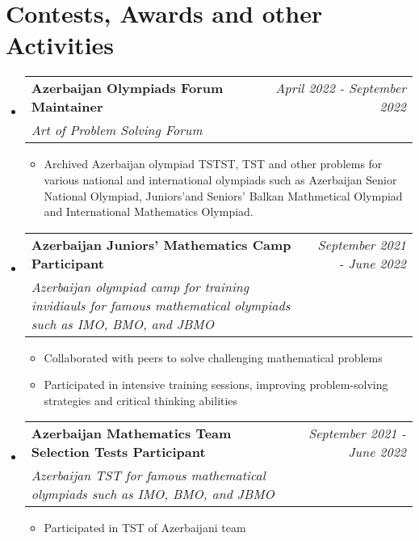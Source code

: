 \documentclass[a4paper,11pt]{article}
\makeatletter
\newcommand{\resumeProject}[4]{
    \vspace{0.5mm}
\item
    \begin{tabular*}{0.98\textwidth}[t]{l@{\extracolsep{\fill}}r}
        \textbf{#1} & \textit{\footnotesize{#3}} \\
        \footnotesize{\textit{#2}} & \footnotesize{#4}
    \end{tabular*}
    \vspace{-2.4mm}
}
\newcommand{\resumeSubHeadingListStart}{
\begin{itemize}[leftmargin=*,labelsep=1mm]}
\newcommand{\resumeItemListStart}{
                \begin{itemize}[leftmargin=*,labelsep=1mm,itemsep=0.5mm]}
\newcommand{\resumeSubHeadingListEnd}{
                    \end{itemize}\vspace{2mm}}
\newcommand{\resumeItemListEnd}{
    \end{itemize}\vspace{-2mm}}
\makeatother
\begin{document}
\section{\textbf{Contests, Awards and other Activities}}
\vspace{-0.4mm}
\resumeSubHeadingListStart
\resumeProject
{Azerbaijan Olympiads Forum Maintainer}
{Art of Problem Solving Forum}
{April 2022 - September 2022}
{{}\href{https://artofproblemsolving.com/community/user/948405}{\textcolor{darkblue}{\faIcon{globe}}}}

\resumeItemListStart
\item Archived Azerbaijan olympiad TSTST, TST and other problems for various national and international olympiads such as Azerbaijan Senior
National Olympiad, Juniors'and Seniors' Balkan Mathmetical Olympiad and International Mathematics Olympiad.
\resumeItemListEnd

\resumeProject
{Azerbaijan Juniors' Mathematics Camp Participant}
{Azerbaijan olympiad camp for training invidiauls for famous mathematical olympiads such as IMO, BMO, and JBMO}
{September 2021 - June 2022}
{}
\resumeItemListStart
\item Collaborated with peers to solve challenging mathematical problems
\item Participated in intensive training sessions, improving problem-solving strategies and critical thinking abilities

\resumeItemListEnd
\resumeProject
{Azerbaijan Mathematics Team Selection Tests Participant}
{Azerbaijan TST for famous mathematical olympiads such as IMO, BMO, and JBMO}
{September 2021 - June 2022}
{}
\resumeItemListStart
\item Participated in TST of Azerbaijani team
\resumeItemListEnd
\resumeSubHeadingListEnd
\vspace{-6mm}
\end{document}
